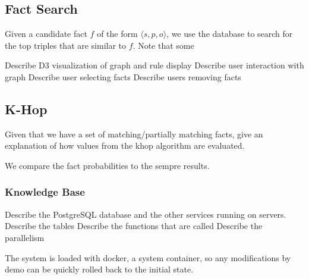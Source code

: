 



\subsection{Fact Search}
\label{sec:probqa-search}

Given a candidate fact \(f\) of the form \(\langle s, p, o \rangle\), we use the
database to search for the top triples that are similar to \(f\).
Note that some 

Describe D3 visualization of graph and rule display
Describe user interaction with graph
Describe user selecting facts
Describe users removing facts


\subsection{K-Hop}
\label{sec:probqa-inference}
Given that we have a set of matching/partially matching facts, give an explanation of how values from the khop algorithm are evaluated.

We compare the fact probabilities to the sempre results.

\subsubsection{Knowledge Base}

Describe the PostgreSQL database and the other services running on servers.
Describe the tables 
Describe the functions that are called
Describe the parallelism

The system is loaded with docker, a system container, so any modifications by demo can be quickly rolled back to the initial state.






